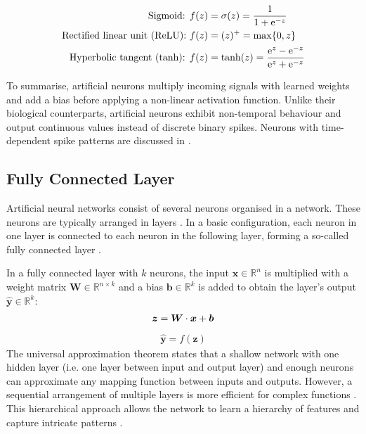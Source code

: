 %
\begin{align}\eqlbl{act_functions}%
		\text{Sigmoid: } & f(z) = \sigma(z) = \frac{1}{1+\mathrm{e}^{-z}}\\
		\text{Rectified linear unit (ReLU): } & f(z) = (z)^{+} = \max\{0, z\}\\
		\text{Hyperbolic tangent (tanh): }  & f(z) = \tanh(z) = \frac{\mathrm{e}^{z}-\mathrm{e}^{-z}}{\mathrm{e}^{z}+\mathrm{e}^{-z}}
\end{align}


To summarise, artificial neurons multiply incoming signals with learned weights and add a bias before applying a non-linear activation function.
Unlike their biological counterparts, artificial neurons exhibit non-temporal behaviour and output continuous values instead of discrete binary spikes. Neurons with time-dependent spike patterns are discussed in .

\subsection{Fully Connected Layer}
Artificial neural networks consist of several neurons organised in a network. These neurons are typically arranged in layers \cite{prince_understanding_2023}. In a basic configuration, each neuron in one layer is connected to each neuron in the following layer, forming a so-called fully connected layer .

In a fully connected layer with $k$ neurons, the input $\boldsymbol{x} \in \mathbb{R}^n$ is multiplied with a weight matrix $\boldsymbol{W} \in \mathbb{R}^{n\times k}$ and a bias $\boldsymbol{b} \in \mathbb{R}^k$ is added to obtain the layer's output $\boldsymbol{\hat{y}} \in \mathbb{R}^k$:
\begin{align}\eqlbl{nn3}%
	\boldsymbol{z} = \boldsymbol{W} \cdot \boldsymbol{x} + \boldsymbol{b}
\end{align}
\begin{align}
	\hat{\boldsymbol{y}} = f(\boldsymbol{z})
\end{align}
%
The universal approximation theorem  states that a shallow network with one hidden layer (i.e. one layer between input and output layer) and enough neurons can approximate any mapping function between inputs and outputs.
However, a sequential arrangement of multiple layers is more efficient for complex functions . This hierarchical approach allows the network to learn a hierarchy of features and capture intricate patterns .

